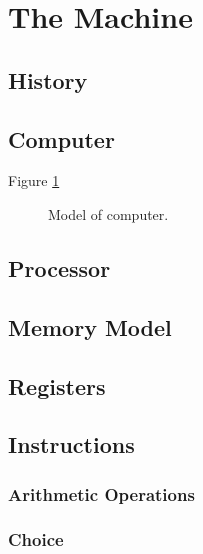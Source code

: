 \section{The Machine}
\label{sec:machine}

\subsection{History}







\subsection{Computer}

Figure \ref{fig:machine:computer}

\begin{figure}[tbp]
  
  \caption{Model of computer.}
  \label{fig:machine:computer}
\end{figure}

\subsection{Processor}

\subsection{Memory Model}

\subsection{Registers}

\subsection{Instructions}

\subsubsection{Arithmetic Operations}

\subsubsection{Choice}

